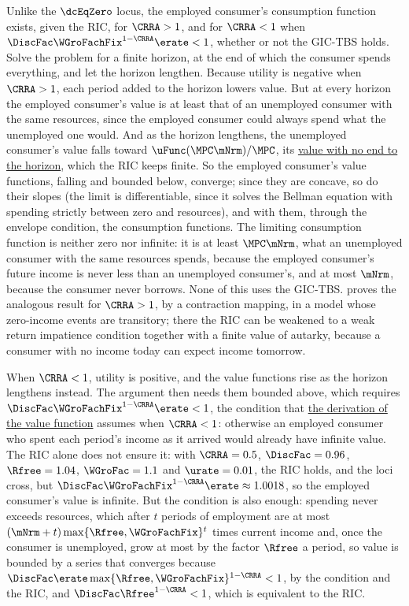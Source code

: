 \documentclass{econark}
\begin{document}
Unlike the $\dcEqZero$ locus, the employed consumer's consumption function exists, given the RIC, for $\CRRA > 1$, and for $\CRRA < 1$ when $\DiscFac \WGroFachFix^{1-\CRRA} \erate < 1$, whether or not the GIC-TBS holds.  Solve the problem for a finite horizon, at the end of which the consumer spends everything, and let the horizon lengthen.  Because utility is negative when $\CRRA > 1$, each period added to the horizon lowers value.  But at every horizon the employed consumer's value is at least that of an unemployed consumer with the same resources, since the employed consumer could always spend what the unemployed one would.  And as the horizon lengthens, the unemployed consumer's value falls toward $\uFunc(\MPC\mNrm)/\MPC$, its \hyperref[sec:TractableBufferStock-ValueFunction]{value with no end to the horizon}, which the RIC keeps finite.  So the employed consumer's value functions, falling and bounded below, converge; since they are concave, so do their slopes (the limit is differentiable, since it solves the Bellman equation with spending strictly between zero and resources), and with them, through the envelope condition, the consumption functions.  The limiting consumption function is neither zero nor infinite: it is at least $\MPC\mNrm$, what an unemployed consumer with the same resources spends, because the employed consumer's future income is never less than an unemployed consumer's, and at most $\mNrm$, because the consumer never borrows.  None of this uses the GIC-TBS.  \citet{BufferStockTheory} proves the analogous result for $\CRRA > 1$, by a contraction mapping, in a model whose zero-income events are transitory; there the RIC can be weakened to a weak return impatience condition together with a finite value of autarky, because a consumer with no income today can expect income tomorrow.

When $\CRRA < 1$, utility is positive, and the value functions rise as the horizon lengthens instead.  The argument then needs them bounded above, which requires $\DiscFac \WGroFachFix^{1-\CRRA} \erate < 1$, the condition that \hyperref[sec:TractableBufferStock-ValueFunction]{the derivation of the value function} assumes when $\CRRA < 1$: otherwise an employed consumer who spent each period's income as it arrived would already have infinite value.  The RIC alone does not ensure it: with $\CRRA = 0.5$, $\DiscFac = 0.96$, $\Rfree = 1.04$, $\WGroFac = 1.1$ and $\urate = 0.01$, the RIC holds, and the loci cross, but $\DiscFac \WGroFachFix^{1-\CRRA} \erate \approx 1.0018$, so the employed consumer's value is infinite.  But the condition is also enough: spending never exceeds resources, which after $t$ periods of employment are at most $(\mNrm+t)\max\{\Rfree,\WGroFachFix\}^{t}$ times current income and, once the consumer is unemployed, grow at most by the factor $\Rfree$ a period, so value is bounded by a series that converges because $\DiscFac \erate \max\{\Rfree,\WGroFachFix\}^{1-\CRRA} < 1$, by the condition and the RIC, and $\DiscFac \Rfree^{1-\CRRA} < 1$, which is equivalent to the RIC.
\end{document}

